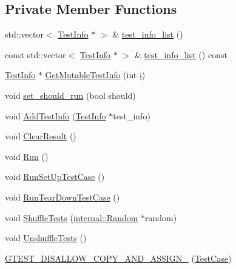 \subsection*{Private Member Functions}
\begin{DoxyCompactItemize}
\item 
std\+::vector$<$ \mbox{\hyperlink{classtesting_1_1_test_info}{Test\+Info}} $\ast$ $>$ \& \mbox{\hyperlink{classtesting_1_1_test_case_adbfcf952eb18dc82d4b20f6bc31aee04}{test\+\_\+info\+\_\+list}} ()
\item 
const std\+::vector$<$ \mbox{\hyperlink{classtesting_1_1_test_info}{Test\+Info}} $\ast$ $>$ \& \mbox{\hyperlink{classtesting_1_1_test_case_a7b4460807b77fd63922528a76daf38ba}{test\+\_\+info\+\_\+list}} () const
\item 
\mbox{\hyperlink{classtesting_1_1_test_info}{Test\+Info}} $\ast$ \mbox{\hyperlink{classtesting_1_1_test_case_aee03569f8ecb89cfe479e71f11edc3ea}{Get\+Mutable\+Test\+Info}} (int \mbox{\hyperlink{_obj__test_2lib_2googletest-master_2googlemock_2test_2gmock-matchers__test_8cc_acb559820d9ca11295b4500f179ef6392}{i}})
\item 
void \mbox{\hyperlink{classtesting_1_1_test_case_a58ecf00d6682b83caef887682b6012f0}{set\+\_\+should\+\_\+run}} (bool should)
\item 
void \mbox{\hyperlink{classtesting_1_1_test_case_a21ca9697c5f91554c752411f8ea556cf}{Add\+Test\+Info}} (\mbox{\hyperlink{classtesting_1_1_test_info}{Test\+Info}} $\ast$test\+\_\+info)
\item 
void \mbox{\hyperlink{classtesting_1_1_test_case_a4d0498738f8903130a8d0400932e8b54}{Clear\+Result}} ()
\item 
void \mbox{\hyperlink{classtesting_1_1_test_case_a6f5b3724cd5a8e446cd48a6150d08cde}{Run}} ()
\item 
void \mbox{\hyperlink{classtesting_1_1_test_case_a10763d318d617f921803741ec81919c5}{Run\+Set\+Up\+Test\+Case}} ()
\item 
void \mbox{\hyperlink{classtesting_1_1_test_case_a23563c9cbbd004159c6acef2af0e7c39}{Run\+Tear\+Down\+Test\+Case}} ()
\item 
void \mbox{\hyperlink{classtesting_1_1_test_case_ac26160e2aeb3d8c86b611843c5abdb29}{Shuffle\+Tests}} (\mbox{\hyperlink{classtesting_1_1internal_1_1_random}{internal\+::\+Random}} $\ast$random)
\item 
void \mbox{\hyperlink{classtesting_1_1_test_case_ad54a66cd65b4420c960d6db79b7cadf6}{Unshuffle\+Tests}} ()
\item 
\mbox{\hyperlink{classtesting_1_1_test_case_a00a4ea337b43015c71874ece0de58db7}{G\+T\+E\+S\+T\+\_\+\+D\+I\+S\+A\+L\+L\+O\+W\+\_\+\+C\+O\+P\+Y\+\_\+\+A\+N\+D\+\_\+\+A\+S\+S\+I\+G\+N\+\_\+}} (\mbox{\hyperlink{classtesting_1_1_test_case}{Test\+Case}})
\end{DoxyCompactItemize}
